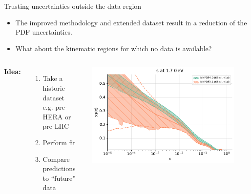 \documentclass[aspectratio=169,10pt]{beamer}
\begin{document}
\begin{frame}{Trusting uncertainties outside the data region}

\begin{itemize}
        \item The improved methodology and extended dataset result in a reduction of the PDF uncertainties.
        \item What about the kinematic regions for which no data is available?
\end{itemize}

\begin{columns}
    \textbf{Idea:}
    \begin{enumerate}
    \item Take a historic dataset \\ e.g. pre-HERA or pre-LHC
    \item Perform fit
    \item Compare predictions to ``future'' data
    \end{enumerate}

     \includegraphics[width=0.9\textwidth]{future_test/NNPDF31_vs_NNPDF40}
\end{columns}
\end{frame}
\end{document}
